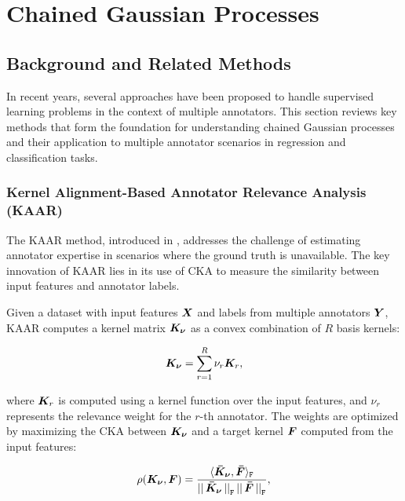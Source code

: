 \chapter{Chained Gaussian Processes}\label{ch:chained_gps}

\section{Background and Related Methods}\label{sec:background}

In recent years, several approaches have been proposed to handle
supervised learning problems in the context of multiple annotators.
This section reviews key methods that form the foundation for
understanding chained Gaussian processes and their application to
multiple annotator scenarios in regression and classification tasks.

\subsection{Kernel Alignment-Based Annotator Relevance Analysis (KAAR)}

The \gls{KAAR} method, introduced in \cite{GilEtAlvarez2023CCGPMA},
addresses the challenge of estimating annotator expertise in
scenarios where the ground truth is unavailable. The key innovation
of \gls{KAAR} lies in its use of \gls{CKA} to measure the similarity
between input features and annotator labels.

Given a dataset with input features ${\bm{X}}$ and labels from
multiple annotators ${\bm{Y}}$, KAAR computes a kernel matrix
${\bm{K}}_{{\bm{\nu}}}$ as a convex combination of $R$ basis kernels:

\begin{align}
  {\bm{K}}_{{\bm{\nu}}} = \sum_{r=1}^{R}\nu_r{\bm{K}}_{r},
\end{align}

where ${\bm{K}}_{r}$ is computed using a kernel function over the
input features, and $\nu_r$ represents the relevance weight for the
$r$-th annotator. The weights are optimized by maximizing the CKA
between ${\bm{K}}_{{\bm{\nu}}}$ and a target kernel ${\bm{F}}$ computed
from the input features:

\begin{align}
  \rho({\bm{K}}_{{\bm{\nu}}},{\bm{F}}) =
  \frac{{\langle{\bm{\bar{K}_{{\bm{\nu}}}}},{\bm{\bar{F}}}\rangle_{\texttt{F}}}}{{{\left|\right|{\bm{\bar{K}_{{\bm{\nu}}}}}\left|\right|_{\texttt{F}}\left|\right|{\bm{\bar{F}}}\left|\right|_{\texttt{F}}}}},
\end{align}

